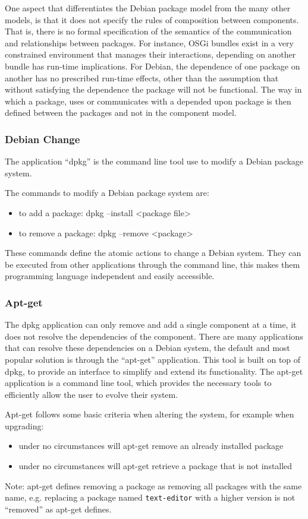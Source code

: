 One aspect that differentiates the Debian package model from the many other models, is that it does not specify the rules of composition between components.
That is, there is no formal specification of the semantics of the communication and relationships between packages.
For instance, OSGi bundles exist in a very constrained environment that manages their interactions, depending on another bundle has run-time implications.
For Debian, the dependence of one package on another has no prescribed run-time effects, other than the assumption that without satisfying the dependence the package will not be functional.
The way in which a package, uses or communicates with a depended upon package is then defined between the packages and not in the component model.

\subsubsection{Debian Change}
The application ``dpkg'' is the command line tool use to modify a Debian package system.

The commands to modify a Debian package system are:
\begin{itemize}
  \item to add a package: dpkg --install <package file>
  \item to remove a package: dpkg --remove <package>
\end{itemize}

These commands define the atomic actions to change a Debian system.
They can be executed from other applications through the command line, this makes them programming language independent and easily accessible. 

\subsubsection{Apt-get}
The dpkg application can only remove and add a single component at a time, it does not resolve the dependencies of the component.
There are many applications that can resolve these dependencies on a Debian system, the default and most popular solution is through the ``apt-get'' application.
This tool is built on top of dpkg, to provide an interface to simplify and extend its functionality.
The apt-get application is a command line tool, which provides the necessary tools to efficiently allow the user to evolve their system.

Apt-get follows some basic criteria when altering the system, for example when upgrading:
\begin{itemize}
  \item under no circumstances will apt-get remove an already installed package
  \item under no circumstances will apt-get retrieve a package that is not installed
\end{itemize}
Note: apt-get defines removing a package as removing all packages with the same name, e.g. replacing a package named \texttt{text-editor} with a higher version is not ``removed'' as apt-get defines.

